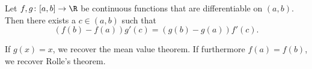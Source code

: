 \begin{theorem*} \label{thm:mvt:general}
    Let $f, g\colon [a, b] \to \R$ be continuous functions that are
    differentiable on $(a, b)$.
    Then there exists a $c \in (a, b)$ such that \[
        (f(b) - f(a)) g'(c) = (g(b) - g(a)) f'(c).
    \]
\end{theorem*}
\begin{remark}
    If $g(x) = x$, we recover the mean value theorem.
    If furthermore $f(a) = f(b)$, we recover Rolle's theorem.
\end{remark}
